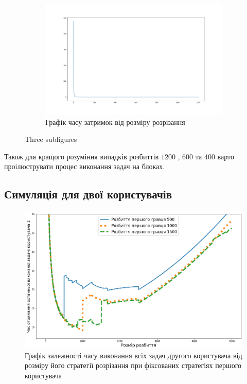 \begin{figure}[H]
	\begin{subfigure}[b]{0.5\linewidth}
		\centering
		\includegraphics[width=\textwidth]{practice/img/latency_time_sep}
		\caption{Графік часу затримок від розміру розрізання}
		\label{fig:latency_time_sep}
	\end{subfigure}
	\caption{Three subfigures}
	\label{fig:test}	
\end{figure}

Також для кращого розуміння випадків розбиттів $1200$ , $600$ та $400$ варто проілюструвати процес виконання задач на блоках.






\subsection{Симуляція для двої користувачів}

\begin{figure}[H]
	\centering
	\includegraphics[width=\textwidth]{practice/img/two_users_fixed_first}
	\caption{Графік залежності часу виконання всіх задач другого користувача від розміру його стратегії розрізання при фіксованих стратегіях першого користувача}
	\label{fig:two_users_fixed_first}
\end{figure}

